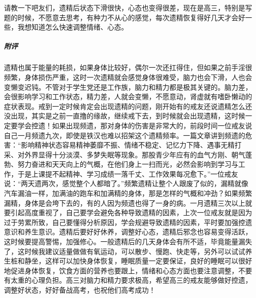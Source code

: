 \begin{case}
    请教一下吧友们，遗精后状态下滑很快，心态也变得很差，现在是高三，特别是写题的时候，不愿意去思考，有种力不从心的感觉，每次遗精恢复得好几天才会好一些，我想知道怎么快速调整情绪、心态。
    \subparagraph{附评} 遗精也属于能量的耗损，如果身体比较好，偶尔一次还扛得住，但如果之前手淫很频繁，身体损伤严重，这时一次遗精就会感觉身体很难受，脑力也会下滑，人也会变懒变迟钝。不管对于学生党还是工作族，脑力和精力都是极其关键的。脑力差，会很影响学习和工作状态，精力差，人就会变懒，不愿意动，肾虚就有嗜卧懒动的症状表现。戒到一定时候肯定会出现遗精的问题，刚开始有的戒友还说遗精怎么还没出现，其实是之前一直撸的缘故，继续戒下去，到时候就会出现遗精，这时候一定要学会控遗！如果出现频遗，那对身体的伤害是非常大的，前段时间一位戒友说自己一月频遗九次，即使是铁汉也难以招架这个遗精频率。一篇文章讲到频遗的危害：“影响精神状态容易精神萎靡不振、情绪不稳定、记忆力下降、遇事无精打采、对外界显得十分淡漠、多梦失眠等现象。那股青少年应有的血气方刚、朝气蓬勃、努力奋进和天天向上的气概，在他们身上一扫而光，必然会影响到学习与工作，于是上课提不起精神、学习成绩一落千丈、工作效果每况愈下。”一位戒友说：“两天遗两次，感觉整个人都暗了。”频繁遗精让整个人跟废了似的，漏精就像汽车漏油一样，加满油的跑车和加满精的身体，那是怎样的气概和冲劲？如果频繁漏精，身体是会垮下去的，有的人因为频遗也得了一身的病。一月遗精三次以上就要引起高度重视了，自己要学会避免各种导致遗精的因素，上次一位戒友就是因为过于劳累所致，自己要懂得分析原因，学会规避导致遗精的因素，平时要加强控遗意识和养生意识。遗精后要好好休养，调整好心态，遗精后邪念也容易变得活跃，这时候要提高警惕，加强修心。一般遗精后的几天身体会有所不适，毕竟能量漏失了，这时候我建议适量做做有氧运动，可以散步、慢跑、快走等，另外可以试试养生桩和静坐，这样可以加快身体恢复，睡眠质量一定要保证，良好的睡眠可以很好地促进身体恢复，饮食方面的营养也要跟上，情绪和心态方面也要注意调整，不要有太重的心理负担。高三对脑力和精力要求极高，希望高三的戒友能够做好控遗，调整好状态，好好备战高考，也祝他们高考成功！
\end{case}

